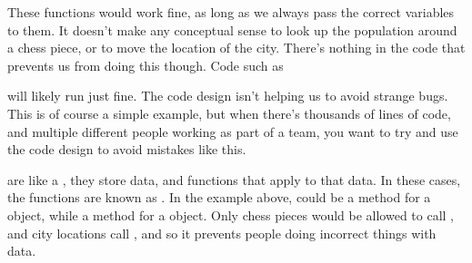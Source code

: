 \documentclass[letterpaper,10pt,british]{sphinxmanual}
\begin{document}
\begin{sphinxVerbatim}[commandchars=\\\{\}]
  
    \PYG{p}{[}\PYG{p}{]}  
    \PYG{p}{[}\PYG{p}{]}  
     

      \PYG{p}{[}\PYG{p}{]}\PYG{p}{[}\PYG{p}{]}
      
     
\end{sphinxVerbatim}

\sphinxAtStartPar
These functions would work fine, as long as we always pass the correct variables to them. It doesn’t make any conceptual sense to look up the population around a chess piece, or to move the location of the city. There’s nothing in the code that prevents us from doing this though. Code such as

\begin{sphinxVerbatim}[commandchars=\\\{\}]
  \PYG{p}{[} \PYG{p}{]}
    
\end{sphinxVerbatim}

\sphinxAtStartPar
will likely run just fine. The code design isn’t helping us to avoid strange bugs. This is of course a simple example, but when there’s thousands of lines of code, and multiple different people working as part of a team, you want to try and use the code design to avoid mistakes like this.

\sphinxAtStartPar
{} are like a , they store data, and functions that apply to that data. In these cases, the functions are known as . In the example above,  could be a method for a  object, while  a method for a  object. Only chess pieces would be allowed to call , and city locations call , and so it prevents people doing incorrect things with data.
\end{document}
